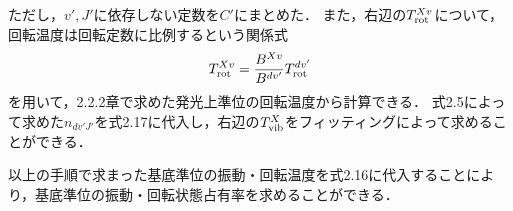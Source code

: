 ただし，$v', J'$に依存しない定数を$C'$にまとめた．
また，右辺の$T^{Xv}_{\rm rot}$について，回転温度は回転定数に比例するという関係式\cite{rot-temperature-ratio}
\begin{equation}
    T^{Xv}_{\rm rot} = \frac{B^{Xv}}{B^{dv'}} T^{dv'}_{\rm rot}
\end{equation}
を用いて，2.2.2章で求めた発光上準位の回転温度から計算できる．
式2.5によって求めた$n_{dv'J'}$を式2.17に代入し，右辺の$T^{X}_{\rm vib}$をフィッティングによって求めることができる．

以上の手順で求まった基底準位の振動・回転温度を式2.16に代入することにより，基底準位の振動・回転状態占有率を求めることができる．